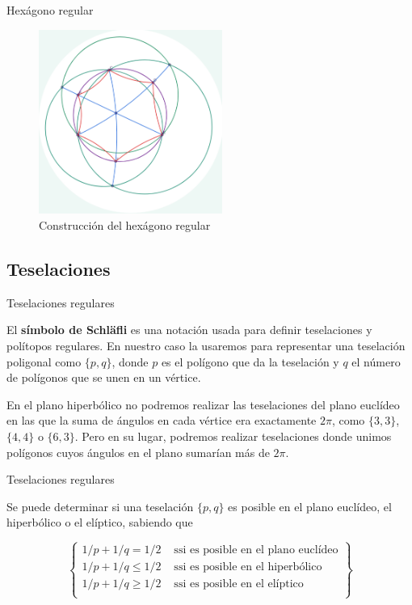 \documentclass[compress]{beamer}
\begin{document}
\begin{frame}{Hexágono regular}
  \begin{figure}[ht!]
    \centering
    \includegraphics[width=60mm]{./hexagon.png}
    \caption{Construcción del hexágono regular \label{hexagon}}
  \end{figure}
\end{frame}


\subsection{Teselaciones}

\begin{frame}{Teselaciones regulares}
\begin{definition}
  El \textbf{símbolo de Schläfli} es una notación usada para definir
  teselaciones y polítopos regulares. En nuestro caso la usaremos para
  representar una teselación poligonal como $\{p,q\}$, donde $p$ es el
  polígono que da la teselación y $q$ el número de polígonos que se unen
  en un vértice.
\end{definition}

En el plano hiperbólico no podremos realizar las teselaciones del
plano euclídeo en las que la suma de ángulos en cada vértice era
exactamente $2\pi$, como $\{3,3\}$, $\{4,4\}$ o $\{6,3\}$. Pero en su
lugar, podremos realizar teselaciones donde unimos polígonos cuyos
ángulos en el plano sumarían más de $2\pi$.
\end{frame}

\begin{frame}{Teselaciones regulares}
  \begin{theorem}
  Se puede determinar si una teselación $\{p,q\}$ es posible en el plano
  euclídeo, el hiperbólico o el elíptico, sabiendo que

  \[
    \left\{
      \begin{array}{cc}
        1/p + 1/q = 1/2    &\text{ ssi es posible en el plano euclídeo} \\
        1/p + 1/q \leq 1/2 &\text{ ssi es posible en el hiperbólico} \\
        1/p + 1/q \geq 1/2 &\text{ ssi es posible en el elíptico} \\
      \end{array}
    \right\}
  \]
\end{theorem}
\end{frame}
\end{document}

